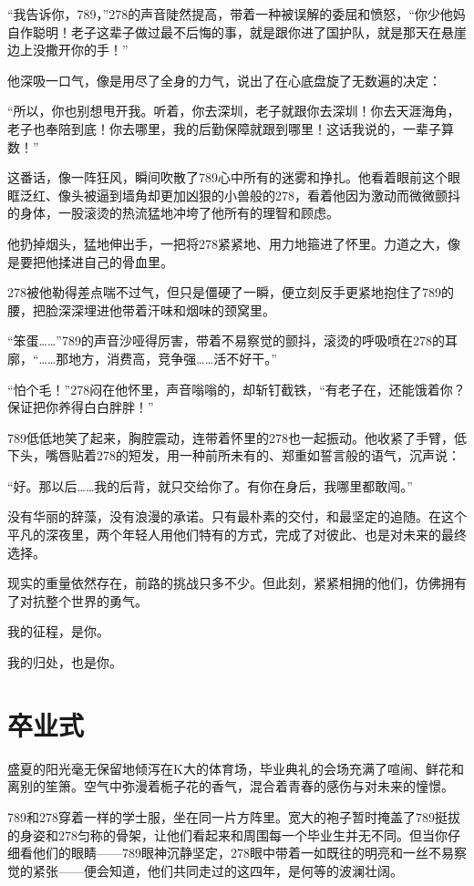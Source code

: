 \documentclass[a4paper]{book}
\begin{document}
“我告诉你，789，”278的声音陡然提高，带着一种被误解的委屈和愤怒，“你少他妈自作聪明！老子这辈子做过最不后悔的事，就是跟你进了国护队，就是那天在悬崖边上没撒开你的手！”

他深吸一口气，像是用尽了全身的力气，说出了在心底盘旋了无数遍的决定：

“所以，你也别想甩开我。听着，你去深圳，老子就跟你去深圳！你去天涯海角，老子也奉陪到底！你去哪里，我的后勤保障就跟到哪里！这话我说的，一辈子算数！”

这番话，像一阵狂风，瞬间吹散了789心中所有的迷雾和挣扎。他看着眼前这个眼眶泛红、像头被逼到墙角却更加凶狠的小兽般的278，看着他因为激动而微微颤抖的身体，一股滚烫的热流猛地冲垮了他所有的理智和顾虑。

他扔掉烟头，猛地伸出手，一把将278紧紧地、用力地箍进了怀里。力道之大，像是要把他揉进自己的骨血里。

278被他勒得差点喘不过气，但只是僵硬了一瞬，便立刻反手更紧地抱住了789的腰，把脸深深埋进他带着汗味和烟味的颈窝里。

“笨蛋……”789的声音沙哑得厉害，带着不易察觉的颤抖，滚烫的呼吸喷在278的耳廓，“……那地方，消费高，竞争强……活不好干。”

“怕个毛！”278闷在他怀里，声音嗡嗡的，却斩钉截铁，“有老子在，还能饿着你？保证把你养得白白胖胖！”

789低低地笑了起来，胸腔震动，连带着怀里的278也一起振动。他收紧了手臂，低下头，嘴唇贴着278的短发，用一种前所未有的、郑重如誓言般的语气，沉声说：

“好。那以后……我的后背，就只交给你了。有你在身后，我哪里都敢闯。”

没有华丽的辞藻，没有浪漫的承诺。只有最朴素的交付，和最坚定的追随。在这个平凡的深夜里，两个年轻人用他们特有的方式，完成了对彼此、也是对未来的最终选择。

现实的重量依然存在，前路的挑战只多不少。但此刻，紧紧相拥的他们，仿佛拥有了对抗整个世界的勇气。

我的征程，是你。

我的归处，也是你。
\normalsize
\section{卒业式}
\songti{}
盛夏的阳光毫无保留地倾泻在K大的体育场，毕业典礼的会场充满了喧闹、鲜花和离别的笙箫。空气中弥漫着栀子花的香气，混合着青春的感伤与对未来的憧憬。

789和278穿着一样的学士服，坐在同一片方阵里。宽大的袍子暂时掩盖了789挺拔的身姿和278匀称的骨架，让他们看起来和周围每一个毕业生并无不同。但当你仔细看他们的眼睛——789眼神沉静坚定，278眼中带着一如既往的明亮和一丝不易察觉的紧张——便会知道，他们共同走过的这四年，是何等的波澜壮阔。
\end{document}
